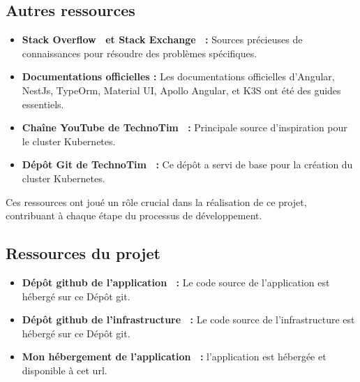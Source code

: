 \subsection{Autres ressources}\label{subsec:autres-ressources}
\begin{itemize}
    \item \textbf{Stack Overflow~\cite{StackOve24:online} et Stack Exchange~\cite{HotQuest86:online} :} Sources précieuses de connaissances pour résoudre des problèmes spécifiques.
    \item \textbf{Documentations officielles :} Les documentations officielles d'Angular, NestJs, TypeOrm, Material UI, Apollo Angular, et K3S ont été des guides essentiels.
    \item \textbf{Chaîne YouTube de TechnoTim~\cite{1TechnoT44:online} :} Principale source d'inspiration pour le cluster Kubernetes.
    \item \textbf{Dépôt Git de TechnoTim~\cite{technoti52:online} :} Ce dépôt a servi de base pour la création du cluster Kubernetes.
\end{itemize}

Ces ressources ont joué un rôle crucial dans la réalisation de ce projet, contribuant à chaque étape du processus de développement.

\subsection{Ressources du projet}\label{subsec:ressources-du-projet}
\begin{itemize}
    \item \textbf{Dépôt github de l'application~\cite{craftbra13:online} :} Le code source de l'application est hébergé sur ce Dépôt git.
    \item \textbf{Dépôt github de l'infrastructure~\cite{craftbra86:online} :} Le code source de l'infrastructure est hébergé sur ce Dépôt git.
    \item \textbf{Mon hébergement de l'application~\cite{CleverPa16:online} :} l'application est hébergée et disponible à cet \Gls{url}.
\end{itemize}